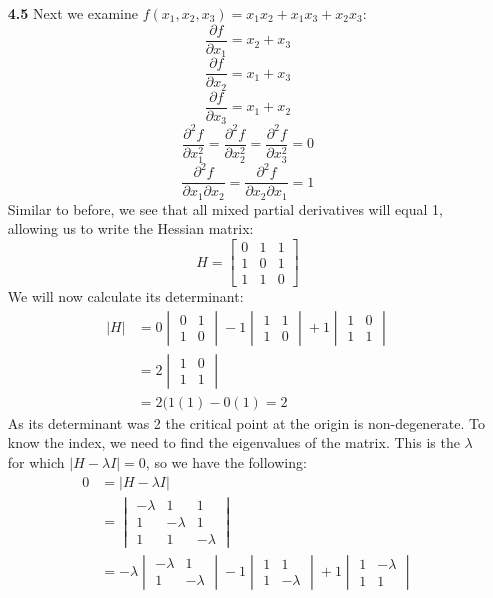 \documentclass[12pt]{report}
\begin{document}
\begin{enumerate}
\item[\bf 4.5] Next we examine $f(x_1,x_2,x_3)=x_1x_2+x_1x_3+x_2x_3$:
$$\frac{\partial f}{\partial x_1} = x_2+x_3$$
$$\frac{\partial f}{\partial x_2} = x_1+x_3$$
$$\frac{\partial f}{\partial x_3} = x_1+x_2$$
$$\frac{\partial^2 f}{\partial x_1^2} = \frac{\partial^2 f}{\partial x_2^2} = \frac{\partial^2 f}{\partial x_3^2} = 0$$
$$\frac{\partial^2 f}{\partial x_1\partial x_2} = \frac{\partial^2 f}{\partial x_2\partial x_1} = 1$$
Similar to before, we see that all mixed partial derivatives will equal 1, allowing us to write the Hessian matrix:
$$H=\begin{bmatrix}
0 & 1 & 1 \\
1 & 0 & 1 \\
1 & 1 & 0 
\end{bmatrix}$$
We will now calculate its determinant:
\begin{align*}
|H|&= 0\begin{vmatrix} 0 & 1 \\ 1 & 0 \end{vmatrix} - 1\begin{vmatrix} 1 & 1 \\ 1 & 0 \end{vmatrix} + 1\begin{vmatrix} 1 & 0 \\ 1 & 1 \end{vmatrix} \\
&=2\begin{vmatrix} 1 & 0 \\ 1 & 1 \end{vmatrix} \\
&= 2(1(1)-0(1) = 2
\end{align*}
As its determinant was 2 the critical point at the origin is non-degenerate. To know the index, we need to find the eigenvalues of the matrix. This is the $\lambda$ for which $|H-\lambda I|=0$, so we have the following:
\begin{align*}
0&= |H-\lambda I| \\
&=\begin{vmatrix}
-\lambda & 1 & 1 \\
1 & -\lambda & 1 \\
1 & 1 & -\lambda 
\end{vmatrix} \\
&= -\lambda\begin{vmatrix} -\lambda & 1 \\ 1 & -\lambda \end{vmatrix} - 1\begin{vmatrix} 1 & 1 \\ 1 & -\lambda \end{vmatrix} + 1\begin{vmatrix} 1 & -\lambda \\ 1 & 1 \end{vmatrix} \\

\end{align*}
\end{enumerate}
\end{document}
